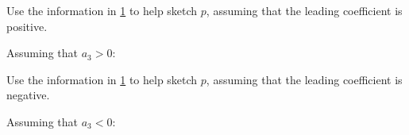 \begin{exercises}
\begin{problem}
\begin{figure}[!htbp]
\begin{widepage}
\begin{subfigure}{.45\textwidth}
		\caption{}
		\label{poly:fig:optionsp1}
	\end{subfigure}%
	\hfill
	\begin{subfigure}{.45\textwidth}
		\caption{}
		\label{poly:fig:optionsp2}
	\end{subfigure}%
	\caption{}
	\end{widepage}
\end{figure}
\begin{subproblem}
	Use the information in \cref{poly:fig:optionsp1} to help sketch $p$, assuming that the leading coefficient
	is positive.
	\begin{shortsolution}
		Assuming that $a_3>0$:
				
	\end{shortsolution}
\end{subproblem}
\begin{subproblem}
	Use the information in \cref{poly:fig:optionsp1} to help sketch $p$, assuming that the leading coefficient
	is negative.
	\begin{shortsolution}
		Assuming that $a_3<0$:
				

\end{shortsolution}
\end{subproblem}
\end{problem}
\end{exercises}
